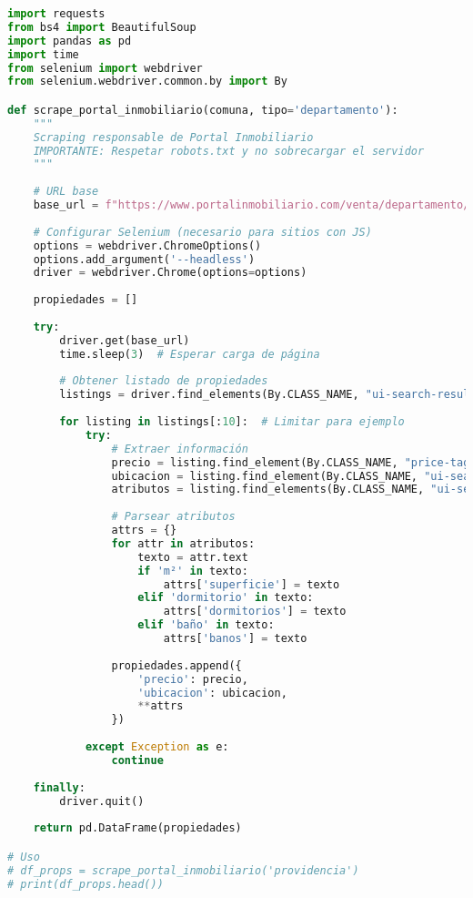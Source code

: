 \documentclass[11pt,a4paper]{article}
\begin{document}
\begin{lstlisting}[language=Python]
import requests
from bs4 import BeautifulSoup
import pandas as pd
import time
from selenium import webdriver
from selenium.webdriver.common.by import By

def scrape_portal_inmobiliario(comuna, tipo='departamento'):
    """
    Scraping responsable de Portal Inmobiliario
    IMPORTANTE: Respetar robots.txt y no sobrecargar el servidor
    """
    
    # URL base
    base_url = f"https://www.portalinmobiliario.com/venta/departamento/{comuna}"
    
    # Configurar Selenium (necesario para sitios con JS)
    options = webdriver.ChromeOptions()
    options.add_argument('--headless')
    driver = webdriver.Chrome(options=options)
    
    propiedades = []
    
    try:
        driver.get(base_url)
        time.sleep(3)  # Esperar carga de página
        
        # Obtener listado de propiedades
        listings = driver.find_elements(By.CLASS_NAME, "ui-search-result")
        
        for listing in listings[:10]:  # Limitar para ejemplo
            try:
                # Extraer información
                precio = listing.find_element(By.CLASS_NAME, "price-tag-fraction").text
                ubicacion = listing.find_element(By.CLASS_NAME, "ui-search-item__location").text
                atributos = listing.find_elements(By.CLASS_NAME, "ui-search-card-attributes__attribute")
                
                # Parsear atributos
                attrs = {}
                for attr in atributos:
                    texto = attr.text
                    if 'm²' in texto:
                        attrs['superficie'] = texto
                    elif 'dormitorio' in texto:
                        attrs['dormitorios'] = texto
                    elif 'baño' in texto:
                        attrs['banos'] = texto
                
                propiedades.append({
                    'precio': precio,
                    'ubicacion': ubicacion,
                    **attrs
                })
                
            except Exception as e:
                continue
        
    finally:
        driver.quit()
    
    return pd.DataFrame(propiedades)

# Uso
# df_props = scrape_portal_inmobiliario('providencia')
# print(df_props.head())
\end{lstlisting}
\end{document}

